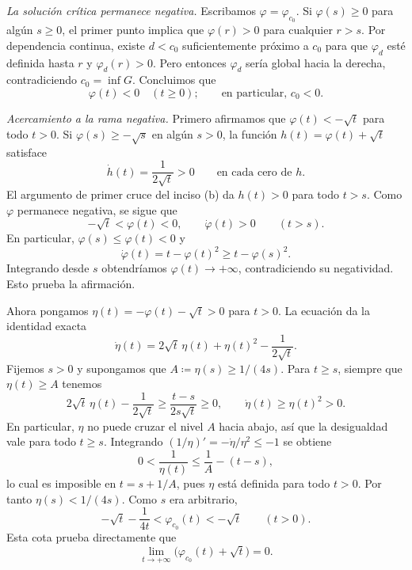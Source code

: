 \begin{sol}
\begin{enumerate}[label = (\alph*)]
\begin{itemize}
        \emph{La solución crítica permanece negativa.}
        Escribamos $\varphi=\varphi_{c_0}$. Si $\varphi(s)\geq0$ para algún $s\geq0$, el primer punto implica que $\varphi(r)>0$ para cualquier $r>s$. Por dependencia continua, existe $d<c_0$ suficientemente próximo a $c_0$ para que $\varphi_d$ esté definida hasta $r$ y $\varphi_d(r)>0$. Pero entonces $\varphi_d$ sería global hacia la derecha, contradiciendo $c_0=\inf G$. Concluimos que
        \[
            \varphi(t)<0\quad(t\geq0);
            \qquad\text{en particular, }c_0<0.
        \]

        \emph{Acercamiento a la rama negativa.}
        Primero afirmamos que $\varphi(t)<-\sqrt t$ para todo $t>0$. Si $\varphi(s)\geq-\sqrt s$ en algún $s>0$, la función $h(t)=\varphi(t)+\sqrt t$ satisface
        \[
            \dot h(t)=\frac{1}{2\sqrt t}>0
            \qquad\text{en cada cero de }h.
        \]
        El argumento de primer cruce del inciso (b) da $h(t)>0$ para todo $t>s$. Como $\varphi$ permanece negativa, se sigue que
        \[
            -\sqrt t<\varphi(t)<0,\qquad
            \dot\varphi(t)>0\qquad(t>s).
        \]
        En particular, $\varphi(s)\leq\varphi(t)<0$ y
        \[
            \dot\varphi(t)=t-\varphi(t)^2
            \geq t-\varphi(s)^2.
        \]
        Integrando desde $s$ obtendríamos $\varphi(t)\to+\infty$, contradiciendo su negatividad. Esto prueba la afirmación.

        Ahora pongamos $\eta(t)=-\varphi(t)-\sqrt t>0$ para $t>0$. La ecuación da la identidad exacta
        \begin{equation}\label{eq:eps}
            \dot\eta(t)
            =2\sqrt t\,\eta(t)+\eta(t)^2-\frac{1}{2\sqrt t}.
        \end{equation}
        Fijemos $s>0$ y supongamos que $A\coloneq\eta(s)\geq1/(4s)$. Para $t\geq s$, siempre que $\eta(t)\geq A$ tenemos
        \[
            2\sqrt t\,\eta(t)-\frac{1}{2\sqrt t}
            \geq\frac{t-s}{2s\sqrt t}\geq0,
            \qquad \dot\eta(t)\geq\eta(t)^2>0.
        \]
        En particular, $\eta$ no puede cruzar el nivel $A$ hacia abajo, así que la desigualdad vale para todo $t\geq s$. Integrando $(1/\eta)'=-\dot\eta/\eta^2\leq-1$ se obtiene
        \[
            0<\frac{1}{\eta(t)}
            \leq\frac1A-(t-s),
        \]
        lo cual es imposible en $t=s+1/A$, pues $\eta$ está definida para todo $t>0$. Por tanto $\eta(s)<1/(4s)$. Como $s$ era arbitrario,
        \[
            -\sqrt t-\frac{1}{4t}<\varphi_{c_0}(t)<-\sqrt t
            \qquad(t>0).
        \]
        Esta cota prueba directamente que
        \[
            \lim_{t\to+\infty}\big(\varphi_{c_0}(t)+\sqrt t\big)=0.
        \]


\end{itemize}
\end{enumerate}
\end{sol}
